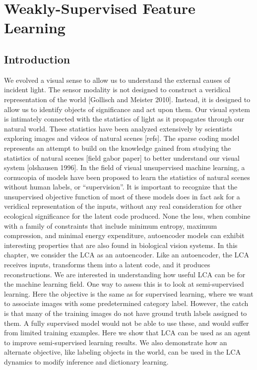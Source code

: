 \chapter{Weakly-Supervised Feature Learning}

\section{Introduction}

We evolved a visual sense to allow us to understand the external causes of incident light. The sensor modality is not designed to construct a veridical representation of the world [Gollisch and Meister 2010]. Instead, it is designed to allow us to identify objects of significance and act upon them. Our visual system is intimately connected with the statistics of light as it propagates through our natural world. These statistics have been analyzed extensively by scientists exploring images and videos of natural scenes [refs]. The sparse coding model represents an attempt to build on the knowledge gained from studying the statistics of natural scenes [field gabor paper] to better understand our visual system [olshausen 1996]. In the field of visual unsupervised machine learning, a cornucopia of models have been proposed to learn the statistics of natural scenes without human labels, or ``supervision''. It is important to recognize that the unsupervised objective function of most of these models does in fact ask for a veridical representation of the inputs, without any real consideration for other ecological significance for the latent code produced. None the less, when combine with a family of constraints that include minimum entropy, maximum compression, and minimal energy expenditure, autoencoder models can exhibit interesting properties that are also found in biological vision systems. In this chapter, we consider the LCA as an autoencoder. Like an autoencoder, the LCA receives inputs, transforms them into a latent code, and it produces reconstructions. We are interested in understanding how useful LCA can be for the machine learning field. One way to assess this is to look at semi-supervised learning. Here the objective is the same as for supervised learning, where we want to associate images with some predetermined category label. However, the catch is that many of the training images do not have ground truth labels assigned to them. A fully supervised model would not be able to use these, and would suffer from limited training examples. Here we show that LCA can be used as an agent to improve semi-supervised learning results. We also demonstrate how an alternate objective, like labeling objects in the world, can be used in the LCA dynamics to modify inference and dictionary learning.

